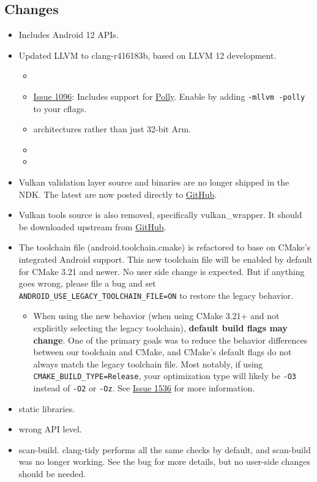 \hypertarget{changes}{%
\subsection{Changes}\label{changes}}

\begin{itemize}
\tightlist
\item
  Includes Android 12 APIs.
\item
  Updated LLVM to clang-r416183b, based on LLVM 12 development.

  \begin{itemize}
  \tightlist
  \item
  \item
    \href{https://github.com/android/ndk/issues/1096}{Issue 1096}:
    Includes support for \href{https://polly.llvm.org/}{Polly}. Enable
    by adding \texttt{-mllvm\ -polly} to your cflags.
  \item
    architectures rather than just 32-bit Arm.
  \item
  \item
  \end{itemize}
\item
  Vulkan validation layer source and binaries are no longer shipped in
  the NDK. The latest are now posted directly to
  \href{https://github.com/KhronosGroup/Vulkan-ValidationLayers/releases}{GitHub}.
\item
  Vulkan tools source is also removed, specifically vulkan\_wrapper. It
  should be downloaded upstream from
  \href{https://github.com/KhronosGroup/Vulkan-Tools}{GitHub}.
\item
  The toolchain file (android.toolchain.cmake) is refactored to base on
  CMake's integrated Android support. This new toolchain file will be
  enabled by default for CMake 3.21 and newer. No user side change is
  expected. But if anything goes wrong, please file a bug and set
  \texttt{ANDROID\_USE\_LEGACY\_TOOLCHAIN\_FILE=ON} to restore the
  legacy behavior.

  \begin{itemize}
  \tightlist
  \item
    When using the new behavior (when using CMake 3.21+ and not
    explicitly selecting the legacy toolchain), \textbf{default build
    flags may change}. One of the primary goals was to reduce the
    behavior differences between our toolchain and CMake, and CMake's
    default flags do not always match the legacy toolchain file. Most
    notably, if using \texttt{CMAKE\_BUILD\_TYPE=Release}, your
    optimization type will likely be \texttt{-O3} instead of
    \texttt{-O2} or \texttt{-Oz}. See
    \href{https://github.com/android/ndk/issues/1536}{Issue 1536} for
    more information.
  \end{itemize}
\item
  static libraries.
\item
  wrong API level.
\item
  scan-build. clang-tidy performs all the same checks by default, and
  scan-build was no longer working. See the bug for more details, but no
  user-side changes should be needed.
\end{itemize}

